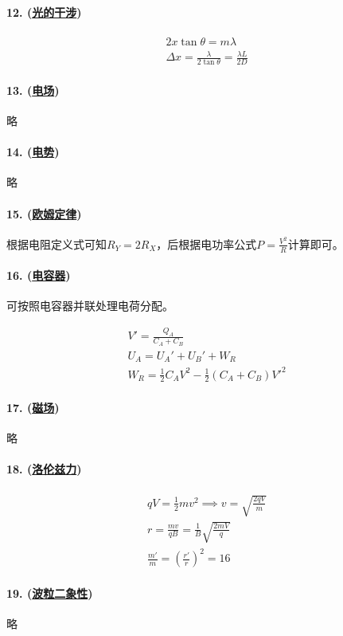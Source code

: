 \paragraph{12. (\hyperref[subsec:光的干涉]{光的干涉})}

\begin{gather*}
    2x\tan\theta=m\lambda\\
    \Delta x=\frac{\lambda}{2\tan\theta}=\frac{\lambda L}{2D}
\end{gather*}

\paragraph{13. (\hyperref[subsec:电场]{电场})} 略
\paragraph{14. (\hyperref[subsec:电势]{电势})} 略
\paragraph{15. (\hyperref[subsec:欧姆定律]{欧姆定律})} 根据电阻定义式可知$R_Y=2R_X$，后根据电功率公式$P=\frac{V^2}{R}$计算即可。
\paragraph{16. (\hyperref[subsec:电容器]{电容器})} 可按照电容器并联处理电荷分配。

\begin{gather*}
    V'=\frac{Q_A}{C_A+C_B}\\
    U_A=U_A'+U_B'+W_R\\
    W_R=\frac12C_AV^2-\frac12(C_A+C_B)V'^2
\end{gather*}

\paragraph{17. (\hyperref[subsec:磁场]{磁场})} 略
\paragraph{18. (\hyperref[subsec:洛伦兹力]{洛伦兹力})}

\begin{gather*}
    qV=\frac12mv^2\implies v=\sqrt{\frac{2qV}{m}}\\
    r=\frac{mv}{qB}=\frac1B\sqrt{\frac{2mV}{q}}\\
    \frac{m'}{m}=\left(\frac{r'}{r}\right)^2=16
\end{gather*}

\paragraph{19. (\hyperref[sec:波粒二象性]{波粒二象性})} 略
